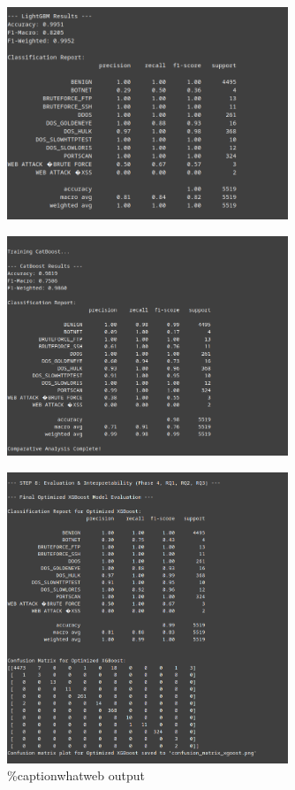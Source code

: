  \begin{figure}[H]
     \centering
     \includegraphics[width=0.75\textwidth]{assets/figures/outputs/7.png}
 \end{figure}
 
 \begin{figure}[H]
     \centering
     \includegraphics[width=0.75\textwidth]{assets/figures/outputs/8.png}
 \end{figure}
 
 \begin{figure}[H]
     \centering
     \includegraphics[width=0.75\textwidth]{assets/figures/outputs/9.png}
     \%caption{whatweb output}
 \end{figure}
 

